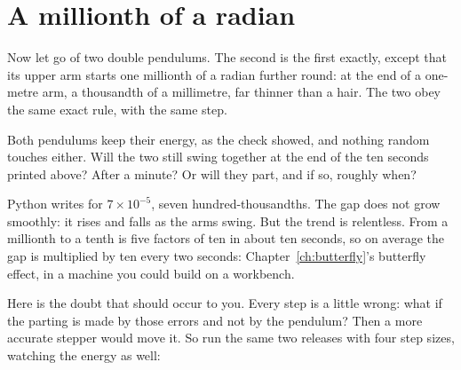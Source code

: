 \section{A millionth of a radian}
\label{sec:ch13-apart}

\noindent
Now let go of two double pendulums. The second is the first exactly, except
that its upper arm starts one millionth of a radian further round: at the end
of a one-metre arm, a thousandth of a millimetre, far thinner than a hair.
The two obey the same exact rule, with the same step.

\begin{think}
Both pendulums keep their energy, as the check showed, and nothing random
touches either. Will the two still swing together at the end of the ten
seconds printed above? After a minute? Or will they part, and if so, roughly
when?
\end{think}




\noindent
Python writes  for $7 \times 10^{-5}$, seven hundred-thousandths.
The gap does not grow smoothly: it rises and falls as the arms swing. But the
trend is relentless. From a millionth to a tenth is five factors of ten in
about ten seconds, so on average the gap is multiplied by ten every two
seconds: Chapter~\ref{ch:butterfly}'s butterfly effect, in a machine you could
build on a workbench.


\noindent
Here is the doubt that should occur to you. Every step is a little wrong:
what if the parting is made by those errors and not by the pendulum? Then a
more accurate stepper would move it. So run the same two releases with four
step sizes, watching the energy as well:

